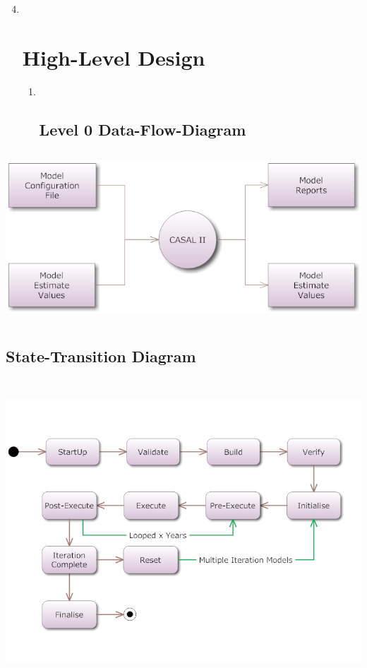 \documentclass[a4paper,11pt,twoside,pdftex,draft]{article}
\begin{document}
\begin{enumerate}
\setcounter{enumi}{3}
\item ~
  \hypertarget{high-level-design}{%
  \section{\texorpdfstring{\textbf{High-Level
  Design}}{High-Level Design}}\label{high-level-design}}

  \begin{enumerate}
  \item ~
    \hypertarget{level-0-data-flow-diagram}{%
    \subsection{Level 0
    Data-Flow-Diagram}\label{level-0-data-flow-diagram}}
  \end{enumerate}
\end{enumerate}

\includegraphics[width=6.0in,height=2.5in]{images/input_output.png}

\hypertarget{state-transition-diagram}{%
\subsection{State-Transition Diagram}\label{state-transition-diagram}}

\includegraphics[width=6.0in,height=4.5in]{images/state_order.png}
\end{document}
